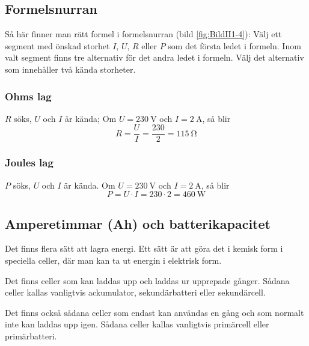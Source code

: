 \subsection{Formelsnurran}
\frdjp


Så här finner man rätt formel i formelsnurran (bild \ref{fig:BildII1-4}):
Välj ett segment med önskad storhet \(I\), \(U\), \(R\) eller \(P\) som det
första ledet i formeln.
Inom valt segment finns tre alternativ för det andra ledet i formeln.
Välj det alternativ som innehåller två kända storheter.


\subsubsection{Ohms lag}

\(R\) söks, \(U\) och \(I\) är kända;
Om \(U = \SI{230}{\volt}\) och \(I = \SI{2}{\ampere}\), så blir
\[R=\dfrac{U}{I}=\dfrac{230}{2}=\SI{115}{\ohm}\]
\subsubsection{Joules lag}

\(P\) söks, \(U\) och \(I\) är kända.
Om \(U = \SI{230}{\volt}\) och \(I = \SI{2}{\ampere}\), så blir
\[P = U \cdot I = 230 \cdot 2 = \SI{460}{\watt}\]
\subsection{Amperetimmar (Ah) och batterikapacitet}
\label{batterikapacitet}

Det finns flera sätt att lagra energi.
Ett sätt är att göra det i kemisk form i speciella celler, där man kan ta ut
energin i elektrisk form.

Det finns celler som kan laddas upp och laddas ur upprepade gånger.
Sådana celler kallas vanligtvis ackumulator, sekundärbatteri eller
sekundärcell.

Det finns också sådana celler som endast kan användas en gång och som normalt
inte kan laddas upp igen.
Sådana celler kallas vanligtvis primärcell eller primärbatteri.

